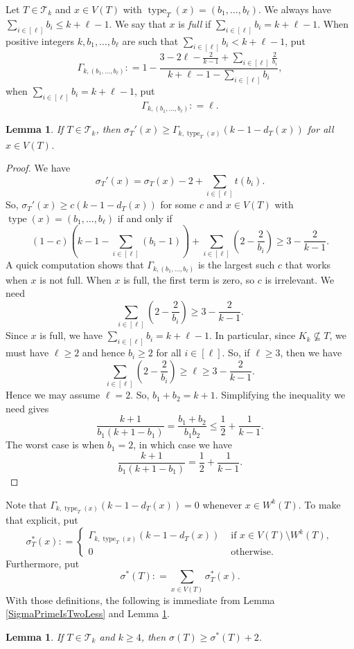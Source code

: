 \documentclass[12pt]{article}
\theoremstyle{plain}
\newtheorem{lem}[thm]{Lemma}
\theoremstyle{definition}
\theoremstyle{remark}
\newcommand{\fancy}[1]{\mathcal{#1}}
\newcommand{\T}{\fancy{T}}
\newcommand{\irange}[1]{\left[#1\right]}
\newcommand{\parens}[1]{\left( #1 \right)}
\newcommand{\DefinedAs}{\mathrel{\mathop:}=}
\newcommand{\type}{\operatorname{type}}
\begin{document}
Let $T \in \T_k$ and $x \in V(T)$ with $\type_T(x) = (b_1, \ldots, b_\ell)$.  We always have $\sum_{i \in \irange{\ell}} b_i \le k + \ell - 1$. We say that $x$ is \emph{full} if $\sum_{i \in \irange{\ell}} b_i = k + \ell - 1$.  When positive integers $k,b_1, \ldots, b_\ell$ are such that $\sum_{i \in \irange{\ell}} b_i < k + \ell - 1$, put 
\[\Gamma_{k,(b_1,\ldots,b_{\ell})} \DefinedAs 1 - \frac{3 - 2\ell - \frac{2}{k-1} + \sum_{i \in \irange{\ell}} \frac{2}{b_i}}{k + \ell - 1 - \sum_{i \in \irange{\ell}} b_i},\]
when $\sum_{i \in \irange{\ell}} b_i = k + \ell - 1$, put
\[\Gamma_{k,(b_1,\ldots,b_{\ell})} \DefinedAs \ell.\]

\begin{lem}\label{PrimeGammaBound}
	If $T \in \T_k$, then $\sigma_T'(x) \ge \Gamma_{k,\type_T(x)}\parens{k - 1 - d_T(x)}$ for all $x \in V(T)$.
\end{lem}
\begin{proof}
	We have
	\[\sigma_T'(x) = \sigma_T(x) - 2 + \sum_{i \in \irange{\ell}}t(b_i).\]
	So, $\sigma_T'(x) \ge c\parens{k - 1 - d_T(x)}$ for some $c$ and $x \in V(T)$ with $\type(x) = (b_1, \ldots, b_\ell)$ if and only if
	\[(1-c)\parens{k - 1 - \sum_{i\in\irange{\ell}} (b_i-1)} + \sum_{i \in \irange{\ell}} \parens{2 - \frac{2}{b_i}} \ge 3 - \frac{2}{k-1}.\]
	A quick computation shows that $\Gamma_{k,(b_1,\ldots,b_{\ell})}$ is the largest such $c$ that works when $x$ is not full.  When $x$ is full, the first term is zero, so $c$ is irrelevant. We need
	\[\sum_{i \in \irange{\ell}} \parens{2 - \frac{2}{b_i}} \ge 3 - \frac{2}{k-1}.\]
	Since $x$ is full, we have $\sum_{i \in \irange{\ell}} b_i = k + \ell - 1$. In particular, since $K_k \not \subseteq T$, we must have $\ell \ge 2$ and hence $b_i \ge 2$ for all $i \in \irange{\ell}$.  So, if $\ell \ge 3$, then we have
	\[\sum_{i \in \irange{\ell}} \parens{2 - \frac{2}{b_i}} \ge \ell \ge 3 - \frac{2}{k-1}.\]
	Hence we may assume $\ell = 2$.  So, $b_1 + b_2 = k + 1$.  Simplifying the inequality we need gives
	\[\frac{k+1}{b_1(k + 1 - b_1)} = \frac{b_1 + b_2}{b_1b_2} \le \frac12 + \frac{1}{k-1}.\]
	The worst case is when $b_1 = 2$, in which case we have
	\[\frac{k+1}{b_1(k + 1 - b_1)} = \frac12 + \frac{1}{k-1}.\] 
\end{proof}

\noindent Note that $\Gamma_{k,\type_T(x)}\parens{k - 1 - d_T(x)} = 0$ whenever $x \in W^k(T)$.  To make that explicit, put
\[\sigma_T^*(x) \DefinedAs \begin{cases}
\Gamma_{k,\type_T(x)}\parens{k - 1 - d_T(x)} & \text{ if } x \in V(T)\setminus W^k(T),\\
0 & \text{ otherwise}.
\end{cases}\]
Furthermore, put
\[\sigma^*(T) \DefinedAs \sum_{x \in V(T)} \sigma_T^*(x).\]
With those definitions, the following is immediate from Lemma \ref{SigmaPrimeIsTwoLess} and Lemma \ref{PrimeGammaBound}.
\begin{lem}\label{SigmaStarBound}
	If $T \in \T_k$ and $k \ge 4$, then $\sigma(T) \ge \sigma^*(T) + 2$.
\end{lem}
\end{document}
